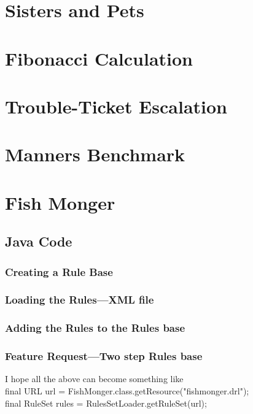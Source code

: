 \chapter{Sisters and Pets}

\chapter{Fibonacci Calculation}

\chapter{Trouble-Ticket Escalation}

\chapter{Manners Benchmark}



\chapter{Fish Monger}
\section{Java Code}
\subsection{Creating a Rule Base}

\subsection{Loading the Rules---XML file}

\subsection{Adding the Rules to the Rules base}

\subsection{Feature Request---Two step Rules base}
I hope all the above can become something like\\
final URL url = FishMonger.class.getResource("fishmonger.drl");\\
final RuleSet rules = RulesSetLoader.getRuleSet(url);


